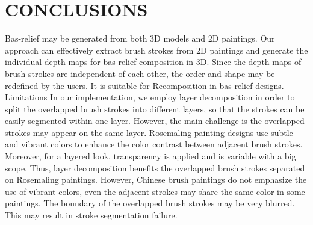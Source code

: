 \chapter{CONCLUSIONS }

Bas-relief may be generated from both 3D models and 2D paintings. Our approach can effectively extract brush strokes from 2D paintings and generate the individual depth maps for bas-relief composition in 3D. Since the depth maps of brush strokes are independent of each other, the order and shape may be redefined by the users. It is suitable for Recomposition in bas-relief designs.
Limitations In our implementation, we employ layer decomposition in order to split the overlapped brush strokes into different layers, so that the strokes can be easily segmented within one layer. However, the main challenge is the overlapped strokes may appear on the same layer. Rosemaling painting designs use subtle and vibrant colors to enhance the color contrast between adjacent brush strokes. Moreover, for a layered look, transparency is applied and is variable with a big scope. Thus, layer decomposition benefits the overlapped brush strokes separated on Rosemaling paintings. However, Chinese brush paintings do not emphasize the use of vibrant colors, even the adjacent strokes may share the same color in some paintings. The boundary of the overlapped brush strokes may be very blurred. This may result in stroke segmentation failure.


